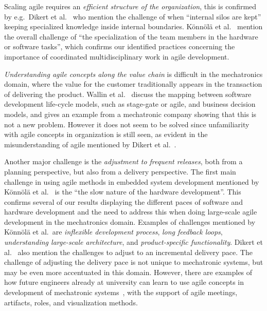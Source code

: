 \documentclass[10pt,a4paper]{IEEEtran} %
\begin{document}
Scaling agile requires an \emph{efficient structure of the organization}, this is confirmed by e.g.~Dikert et al.~\cite{dikert_challenges_2016} who mention the challenge of when ``internal silos are kept'' keeping specialized knowledge inside internal boundaries. Könnölä et al.~\cite{konnola_agile_2016} mention the overall challenge of
``the specialization of the team members in the hardware or software tasks'', which confirms our identified practices concerning the importance of coordinated multidisciplinary work in agile development.

\emph{Understanding agile concepts along the value chain} is difficult in the mechatronics domain, where the value for the customer traditionally appears in the transaction of delivering the product. Wallin et al.~\cite{wallin_integrating_2002} discuss the mapping between software development life-cycle models, such as stage-gate or agile, and business decision models, and gives an example from a mechatronic company showing that this is not a new problem. However it does not seem to be solved since unfamiliarity with agile concepts in organization is still seen, as evident in the misunderstanding of agile mentioned by Dikert et al.~\cite{dikert_challenges_2016}. 

Another major challenge is the \emph{adjustment to frequent releases}, both from a
planning perspective, but also from a delivery perspective. The first main challenge in
using agile methods in embedded system development mentioned by 
Könnölä et al.~\cite{konnola_agile_2016} is the ``the slow nature of the hardware
development''. This confirms several of our results displaying the different paces of
software and hardware development and the need to address this when doing large-scale
agile development in the mechatronics domain. Examples of challenges mentioned by Könnölä et
al.~are \emph{inflexible development process}, \emph{long feedback loops},
\emph{understanding large-scale architecture}, and \emph{product-specific functionality}. Dikert et al.~\cite{dikert_challenges_2016} also mention the challenges to adjust to an incremental delivery pace. The challenge of adjusting the delivery pace is not unique to mechatronic systems, but may be even more accentuated in this domain.  However, there are examples of how future engineers already at university can learn to use agile concepts in development of mechatronic systems~\cite{klein_agile_2016}, with the support of agile meetings, artifacts, roles, and visualization methods.
\end{document}
